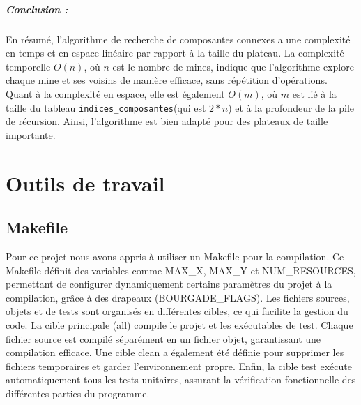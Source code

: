 \documentclass[a4paper,12pt]{report}
\begin{document}
\paragraph{Conclusion :}

En résumé, l'algorithme de recherche de composantes connexes a une complexité en temps et en espace linéaire par rapport à la taille du plateau. La 
complexité temporelle \( O(n) \), où \( n \) est le nombre de mines, indique que l'algorithme explore chaque mine et ses voisins de manière efficace, 
sans répétition d'opérations. Quant à la complexité en espace, elle est également \( O(m) \), où \( m \) est lié à la taille du tableau 
\texttt{indices\_composantes}(qui est \( 2*n \)) et à la profondeur de la pile de récursion. Ainsi, l'algorithme est bien adapté pour des plateaux de taille importante.

\chapter{Outils de travail}
\section{Makefile}
Pour ce projet nous avons appris à utiliser un Makefile pour la compilation. Ce Makefile définit des variables comme MAX\_X, MAX\_Y et NUM\_RESOURCES, permettant de configurer dynamiquement certains paramètres du projet à la compilation, grâce à des drapeaux (BOURGADE\_FLAGS). Les fichiers sources, objets et de tests sont organisés en différentes cibles, ce qui facilite la gestion du code. La cible principale (all) compile le projet et les exécutables de test. Chaque fichier source est compilé séparément en un fichier objet, garantissant une compilation efficace. Une cible clean a également été définie pour supprimer les fichiers temporaires et garder l'environnement propre. Enfin, la cible test exécute automatiquement tous les tests unitaires, assurant la vérification fonctionnelle des différentes parties du programme.
\end{document}
